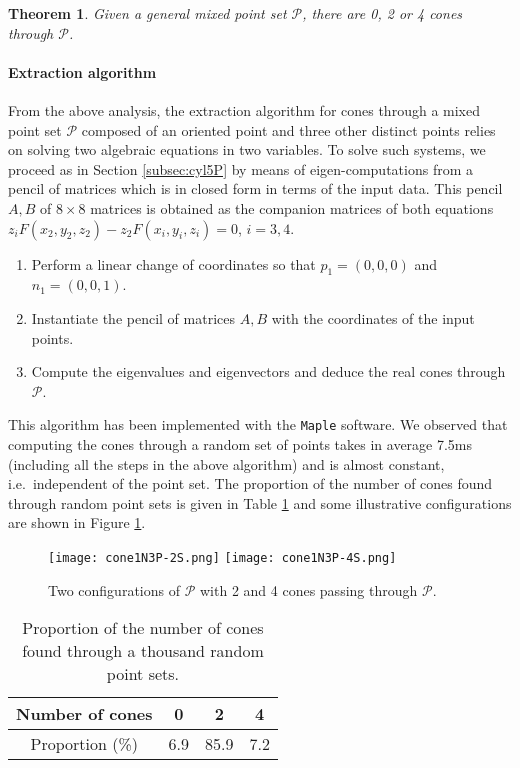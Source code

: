 \documentclass[5p]{elsarticle}
\newtheorem{thm}{Theorem}
\newcommand\Pc{\mathcal P}
\newcommand{\com}[1]{{\color{black} #1}}
\begin{document}
\begin{thm} \com{Given} a general mixed point set $\Pc$, \com{there are} 0, 2 or 4 cones through $\Pc$. 
\end{thm}



\paragraph{Extraction algorithm}

From the above analysis, the extraction algorithm \com{for cones} through a mixed point set $\Pc$ composed of an oriented point and three other distinct points relies \com{on solving} two algebraic equations in two variables. To solve such systems, we proceed as in Section \ref{subsec:cyl5P} by means of eigen-computations from a pencil of matrices which is in closed form in terms of the input data. This pencil $A,B$ of $8\times 8$ matrices is obtained as the companion matrices of both equations $z_iF(x_2,y_2,z_2)-z_2F(x_i,y_i,z_i)=0$, $i=3,4$.

\begin{enumerate}
	\item Perform a linear change of coordinates \com{so that} $p_1=(0,0,0)$ and $n_1=(0,0,1)$. 
	\item Instantiate the pencil of matrices $A,B$ with the coordinates of the input points.
	\item Compute the eigenvalues and eigenvectors and deduce the real cones through $\Pc$.
\end{enumerate} 

This algorithm has been implemented with the {\tt Maple} software. We observed that \com{computing} the \com{cones} through a random set of points takes in average 7.5ms \com{(including all the steps in the above algorithm)} and is almost constant,  \com{i.e.~independent} of the point set. The proportion of the number of \com{cones} found through random point sets is given in Table \ref{tab:cone1N3P} and some illustrative configurations are shown in Figure \ref{fig:cone1N3P}.

\begin{figure}[ht!]
\centering	
   \texttt{[image: cone1N3P-2S.png]}
   \hspace{4em}
   \texttt{[image: cone1N3P-4S.png]}
   \caption{Two configurations of $\Pc$ with 2 and 4 cones passing through $\Pc$.}\label{fig:cone1N3P}
\end{figure}  

\begin{table}[ht!]
\begin{center}
\begin{tabular}{c|c|c|c|}
 Number of cones & 0 & 2 & 4 \\ 
	 \hline
Proportion (\%)	 &  6.9 & 85.9 & 7.2 \\
\hline	
\end{tabular}
\caption{Proportion of the number of \com{cones} found through a thousand random point sets.}\label{tab:cone1N3P}
\end{center}
\end{table}
\end{document}

